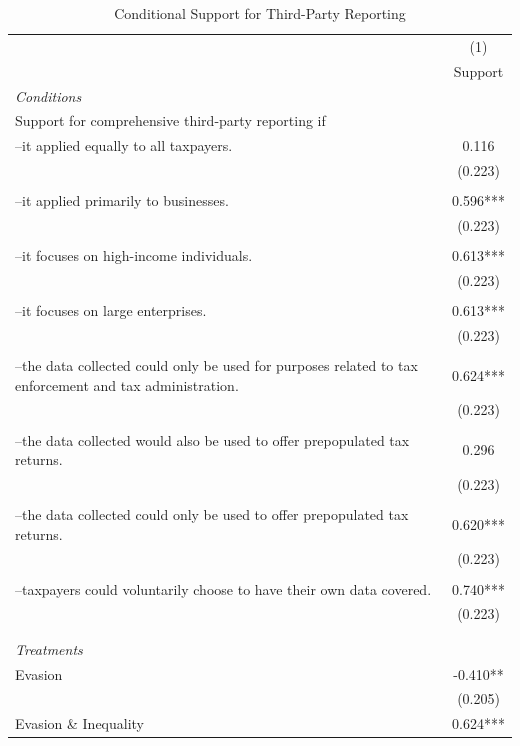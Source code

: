 \documentclass[11pt]{article}
\begin{document}
\FloatBarrier
\begin{table}[!htbp]\centering
\caption{Conditional Support for Third-Party Reporting}
\label{tab:conditionalsupporttpr_c}
\begin{threeparttable}
\footnotesize
\begin{tabular}{l|c}
\toprule
 & (1)\\
 & Support \\
\midrule
\textit{Conditions} \\[0.25em]
Support for comprehensive third-party reporting if \\[0.25em]
--it applied equally to all taxpayers. & 0.116 \\
 & (0.223) \\\\[0.25em]
--it applied primarily to businesses. & 0.596*** \\
 & (0.223) \\\\[0.25em]
--it focuses on high-income individuals. & 0.613*** \\
 & (0.223) \\\\[0.25em]
--it focuses on large enterprises. & 0.613*** \\
 & (0.223) \\\\[0.25em]
--the data collected could only be used for purposes related to tax enforcement and tax administration. & 0.624*** \\
 & (0.223) \\\\[0.25em]
--the data collected would also be used to offer prepopulated tax returns. & 0.296 \\
 & (0.223) \\\\[0.25em]
--the data collected could only be used to offer prepopulated tax returns. & 0.620*** \\
 & (0.223) \\\\[0.25em]
--taxpayers could voluntarily choose to have their own data covered. & 0.740*** \\
 & (0.223) \\\\[0.25em]
\\[1em]
\textit{Treatments} \\[0.25em]
Evasion & -0.410** \\
 & (0.205) \\
Evasion \& Inequality & 0.624*** \\

\end{tabular}
\end{threeparttable}
\end{table}
\end{document}
